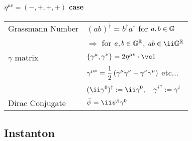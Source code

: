 \paragraph{$\eta^{\mu\nu}=(-,+,+,+)$ case}
\begin{tabular}[t]{l@{\ :\ }l}
 Grassmann Number
& $(ab)^\dagger=b^\dagger a^\dagger$ for $a,b\in\mathbb G$\\
& $\Longrightarrow$ for $a,b\in\mathbb G^\mathbb R$, $ab\in\ii\RealGrassmann$\\
 $\gamma$ matrix
& $\displaystyle\{\Gm,\Gn\}=2\minkow\mu\nu\cdot\vc1$\\
& $\displaystyle\G{\mu\nu} = \frac12\left(\Gm\Gn-\Gn\Gm\right)$
  \quad etc...\\
& $\displaystyle(\ii\G0)^\dagger:=\ii\G0,\quad\G i^\dagger:=\G i$\\
 Dirac Conjugate
& $\bar\psi=\ii\psi^\dagger\G0$
\end{tabular}

\subsection{Instanton}
\label{sec:cs-instanton}





